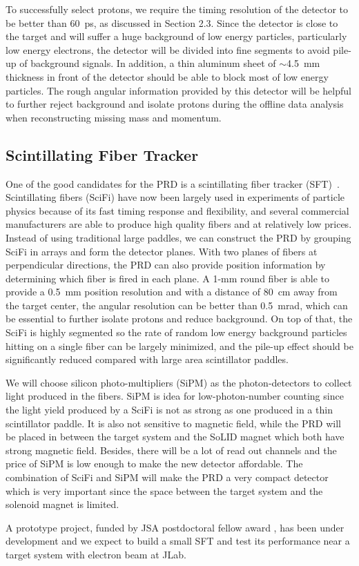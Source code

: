 To successfully select protons, we require the timing resolution of the
detector to be better than 60~ps, as discussed in Section 2.3. Since the
detector is close to the target and will suffer a huge background of low energy
particles, particularly low energy electrons, the detector will be divided
into fine segments to avoid pile-up of background signals. In addition, a thin
aluminum sheet of $\sim$4.5~mm thickness in front of the detector should be
able to block most of low energy particles. The rough angular information
provided by this detector will be helpful to further reject
background and isolate protons during the offline data analysis when
reconstructing missing mass and momentum.

\subsection{Scintillating Fiber Tracker}

One of the good candidates for the PRD is a scintillating fiber tracker
(SFT)~\cite{sft_zye}. Scintillating fibers (SciFi) have now been largely used
in experiments of particle physics because of its fast timing response and
flexibility, and several commercial manufacturers are able to produce high
quality fibers and at relatively low prices. Instead of using traditional large
paddles, we can construct the PRD by grouping SciFi in arrays and form the
detector planes.  With two planes of fibers at perpendicular directions, the
PRD can also provide position information by determining which fiber is fired
in each plane. A 1-mm round fiber is able to provide a 0.5~mm position
resolution and with a distance of 80~cm away from the target center, the
angular resolution can be better than 0.5~mrad, which can be essential to
further isolate protons and reduce background. On top of that, the SciFi is
highly segmented so the rate of random low energy background particles hitting
on a single fiber can be largely minimized, and the pile-up effect should be
significantly reduced compared with large area scintillator paddles.

We will choose silicon photo-multipliers (SiPM) as the photon-detectors to
collect light produced in the fibers. SiPM is idea for low-photon-number
counting since the light yield produced by a SciFi is not as strong as one
produced in a thin scintillator paddle. It is also not sensitive to magnetic
field, while the PRD will be placed in between the target system and the SoLID
magnet which both have strong magnetic field. Besides, there will be a lot of
read out channels and the price of SiPM is low enough to make the new detector
affordable.  The combination of SciFi and SiPM will make the PRD a very compact
detector which is very important since the space between the target system and
the solenoid magnet is limited.

A prototype project, funded by JSA postdoctoral fellow award \cite{sft_zye},
has been under development and we expect to build a small SFT and test its
performance near a target system with electron beam at JLab.


